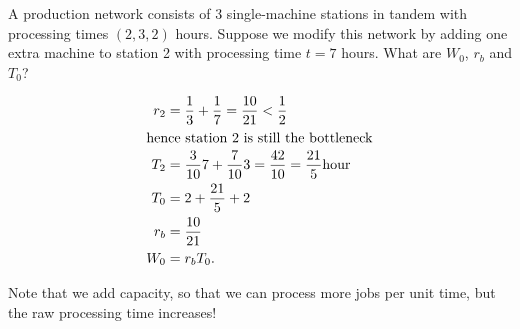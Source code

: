 \begin{exercise}
  A production network consists of 3 single-machine stations in tandem
  with processing times $(2, 3, 2)$ hours.  Suppose we modify this
  network by adding one extra machine to station 2 with processing
  time $t=7$ hours.  What are $W_0$, $r_b$ and $T_0$?
\begin{solution}
  \begin{align*}
  r_2 &= \frac13 + \frac17 = \frac{10}{21} < \frac12\\
\intertext{hence station 2 is still the bottleneck}
T_2 &= \frac{3}{10}7 + \frac{7}{10}3 = \frac{42}{10}=\frac{21}{5}\text{hour}\\
T_0&=2+\frac{21}{5} +2\\
r_b &= \frac{10}{21}\\
W_0 &= r_b T_0.
   \end{align*}

   Note that we add capacity, so that we can process more jobs per
   unit time, but the raw processing time increases!
\end{solution}
\end{exercise}


